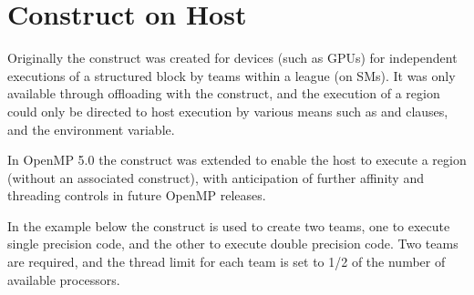 \pagebreak
\section{ Construct on Host}
\label{sec:host_teams}

Originally the  construct was created for devices (such as GPUs)
for independent executions of a structured block by teams within a league (on SMs).
It was only available through offloading with the  construct,
and the execution of a  region could only be directed to host
execution by various means such as  and  clauses,
and the  environment variable.

In OpenMP 5.0 the  construct was extended to enable the host
to execute a  region (without an associated  construct), 
with anticipation of further affinity and threading controls in future OpenMP releases.

In the example below the  construct is used to create two
teams, one to execute single precision code, and the other
to execute double precision code. Two teams are required, and
the thread limit for each team is set to 1/2 of the number of 
available processors.



